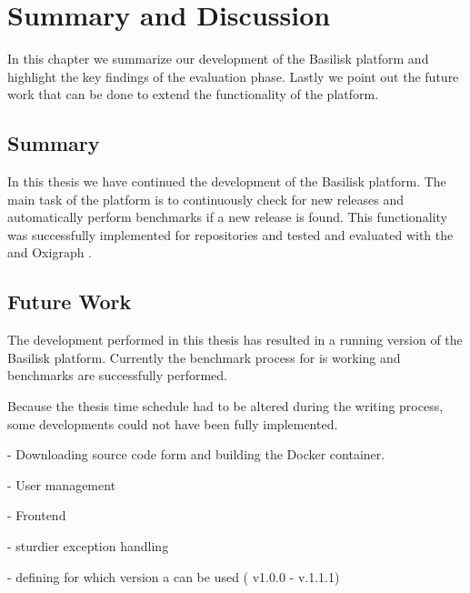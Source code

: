 \chapter{Summary and Discussion}
\label{ch:summary}

In this chapter we summarize our development of the Basilisk platform and highlight the key findings of the evaluation phase.
Lastly we point out the future work that can be done to extend the functionality of the platform.

\section{Summary}
In this thesis we have continued the development of the Basilisk platform.
The main task of the platform is to continuously check for new \ts{} releases and automatically perform benchmarks if a new release is found.
This functionality was successfully implemented for \dockh{} repositories and tested and evaluated with the \tentris{} and Oxigraph \tsp{}.



\section{Future Work}
The development performed in this thesis has resulted in a running version of the Basilisk platform.
Currently the benchmark process for \dockh{} is working and benchmarks are successfully performed.

Because the thesis time schedule had to be altered during the writing process, some developments could not have been fully implemented.


- Downloading source code form \gh{} and building the Docker container.

- User management

- Frontend

- sturdier exception handling

- defining for which version a \ts{} can be used (\eg{} v1.0.0 - v.1.1.1)


